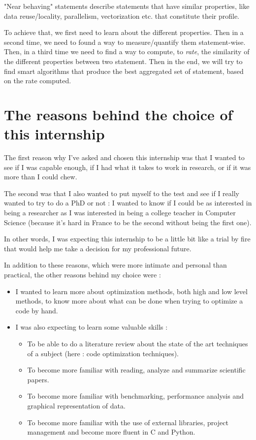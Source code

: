 \documentclass[paper=a4, fontsize=11.5pt]{scrartcl}
\numberwithin{equation}{section}        %
\numberwithin{figure}{section}          %
\numberwithin{table}{section}               %
\begin{document}
"Near behaving" statements describe statements that have similar properties,
like data reuse/locality, parallelism, vectorization etc. that constitute their profile.

To achieve that, we first need to learn about the different properties. Then in a second
time, we need to found a way to measure/quantify them statement-wise. Then, in a third
time we need to find a way to compute, to \textit{rate}, the similarity of the different
properties between two statement. Then in the end, we will try to find smart algorithms
that produce the best aggregated set of statement, based on the rate computed.

\section{The reasons behind the choice of this internship}
The first reason why I've asked and chosen this internship was that I wanted to see
if I was capable enough, if I had what it takes to work in research, or if it was more than I could
chew.

The second was that I also wanted to put myself to the test and see if I really 
wanted to try to do a PhD or not : I wanted to know if I could be as interested in being
a researcher as I was interested in being a college teacher in Computer Science
(because it's hard in France to be the second without being the first one).

In other words,
I was expecting this internship to be a little bit like a trial by fire that would help me
take a decision for my professional future.

\bigskip

In addition to these reasons, which were more intimate and personal than practical, the
other reasons behind my choice were :
\begin{itemize}
    \item[] I wanted to learn more about optimization methods, both high and low level methods,
        to know more about what can be done when trying to optimize a code by hand.
    \item[] I was also expecting to learn some valuable skills :
        \begin{itemize}
            \item To be able to do a literature review about the state of the art techniques of
                a subject (here : code optimization techniques).
            \item To become more familiar with reading, analyze and summarize scientific papers.
            \item To become more familiar with benchmarking, performance analysis and
                graphical representation of data.
            \item To become more familiar with the use of external libraries, project
                management and become more fluent in C and Python.
        \end{itemize}
\end{itemize}
\end{document}

